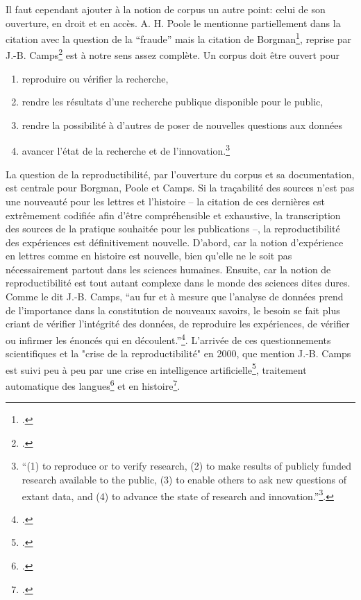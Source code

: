 Il faut cependant ajouter à la notion de corpus un autre point: celui de son ouverture, en droit et en accès. A. H. Poole le mentionne partiellement dans la citation avec la question de la ``fraude'' mais la citation de Borgman\footcite{borgman2012conundrum}, reprise par J.-B. Camps\footcite{camps_ou_2018} est à notre sens assez complète. Un corpus doit être ouvert pour
\begin{enumerate}
    \item reproduire ou vérifier la recherche,
    \item rendre les résultats d'une recherche publique disponible pour le public,
    \item rendre la possibilité à d'autres de poser de nouvelles questions aux données
    \item avancer l'état de la recherche et de l'innovation.\footnote{``(1) to reproduce or to verify research, (2) to make results of publicly funded research available to the public, (3) to enable others to ask new questions of extant data, and (4) to advance the state of research and innovation.''\footnote{\cite{borgman2012conundrum} chez \cite{camps_ou_2018}}.}
\end{enumerate}

La question de la reproductibilité, par l'ouverture du corpus et sa documentation, est centrale pour Borgman, Poole et Camps. Si la traçabilité des sources n'est pas une nouveauté pour les lettres et l'histoire -- la citation de ces dernières est extrêmement codifiée afin d'être compréhensible et exhaustive, la transcription des sources de la pratique souhaitée pour les publications --, la reproductibilité des expériences est définitivement nouvelle. D'abord, car la notion d'expérience en lettres comme en histoire est nouvelle, bien qu'elle ne le soit pas nécessairement partout dans les sciences humaines. Ensuite, car la notion de reproductibilité est tout autant complexe dans le monde des sciences dites dures. Comme le dit J.-B. Camps, ``au fur et à mesure que l’analyse de données prend de l’importance dans la constitution de nouveaux savoirs, le besoin se fait plus criant de vérifier l’intégrité des données, de reproduire les expériences, de vérifier ou infirmer les énoncés qui en découlent.''\footcite{camps_ou_2018}. L'arrivée de ces questionnements scientifiques et la "crise de la reproductibilité" en 2000, que mention J.-B. Camps est suivi peu à peu par une crise en intelligence artificielle\footcite{hutson2018artificial}, traitement automatique des langues\footcite{belz2021systematic} et en histoire\footcite{eijnatten_big_2013}.


